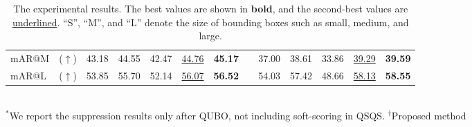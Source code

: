 \begin{table*}
\begin{tabular}{l r ccccc c ccccc}
    mAR@M & ($\uparrow$)      & 43.18 & 44.55 & 42.47 & \underline{44.76} & \textbf{45.17} && 37.00 & 38.61 & 33.86 & \underline{39.29} & \textbf{39.59} \\
    mAR@L  & ($\uparrow$)     & 53.85 & 55.70 & 52.14 & \underline{56.07} & \textbf{56.52} && 54.03 & 57.42 & 48.66 & \underline{58.13} & \textbf{58.55} \\
    \cmidrule(lr){1-7}
    \cmidrule(lr){9-13}
    \end{tabular}
    \\\footnotesize{$^{*}$We report the suppression results only after QUBO, not including soft-scoring in QSQS. $^{\dag}$Proposed method}
    \caption{The experimental results. The best values are shown in \textbf{bold}, and the second-best values are \underline{underlined}. ``S'', ``M'', and ``L'' denote the size of bounding boxes such as small, medium, and large.}
    \label{tab:results_faster_rcnn}
\end{table*}

